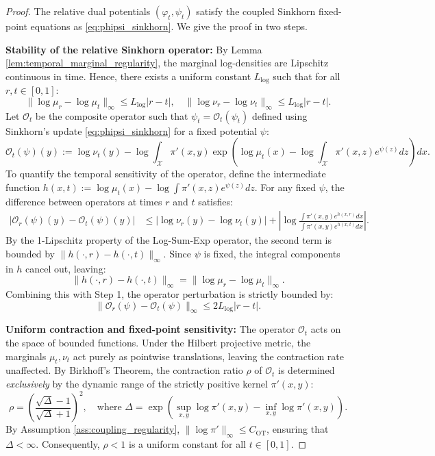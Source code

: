 \documentclass[11pt]{article}
\theoremstyle{definition}
\numberwithin{equation}{section}%
\begin{document}
{\begin{proof}
The relative dual potentials $(\varphi_t, \psi_t)$ satisfy the coupled Sinkhorn fixed-point equations as \eqref{eq:phipsi_sinkhorn}. We give the proof in two steps.

\noindent\textbf{Stability of the relative Sinkhorn operator:}  By Lemma \ref{lem:temporal_marginal_regularity}, the marginal log-densities are Lipschitz continuous in time. Hence, there exists a uniform constant $L_{\log}$ such that for all $r, t \in [0,1]$:
\begin{equation*}
\label{eq:marg_stability_ref}
\|\log \mu_r - \log \mu_t\|_\infty \le L_{\log} |r - t|, \quad \|\log \nu_r - \log \nu_t\|_\infty \le L_{\log} |r - t|.
\end{equation*}
Let $\mathcal{O}_t$ be the composite operator such that $\psi_t = \mathcal{O}_t(\psi_t)$ defined using Sinkhorn's update \eqref{eq:phipsi_sinkhorn} for a fixed potential $\psi$:
\begin{equation*}
\mathcal{O}_t(\psi)(y) := \log \nu_t(y) - \log \int_{\mathcal{X}} \pi'(x,y) \exp \left( \log \mu_t(x) - \log \int_{\mathcal{X}} \pi'(x,z) e^{\psi(z)} dz \right) dx.
\end{equation*}
To quantify the temporal sensitivity of the operator, define the intermediate function $h(x, t) := \log \mu_t(x) - \log \int \pi'(x,z) e^{\psi(z)} dz$. For any fixed $\psi$, the difference between operators at times $r$ and $t$ satisfies:
\begin{align*}
|\mathcal{O}_r(\psi)(y) - \mathcal{O}_t(\psi)(y)| &\le |\log \nu_r(y) - \log \nu_t(y)| + \left| \log \frac{ \int \pi'(x,y) e^{h(x, r)} dx }{ \int \pi'(x,y) e^{h(x, t)} dx } \right|.
\end{align*}
By the 1-Lipschitz property of the Log-Sum-Exp operator, the second term is bounded by $\|h(\cdot, r) - h(\cdot, t)\|_\infty$. Since $\psi$ is fixed, the integral components in $h$ cancel out, leaving:
\[
\|h(\cdot, r) - h(\cdot, t)\|_\infty = \|\log \mu_r - \log \mu_t\|_\infty.
\]
Combining this with Step 1, the operator perturbation is strictly bounded by:
\begin{equation}
\label{eq:operator_perturbation}
\|\mathcal{O}_r(\psi) - \mathcal{O}_t(\psi)\|_\infty \le 2 L_{\log} |r - t|.
\end{equation}

\noindent\textbf{Uniform contraction and fixed-point sensitivity:} The operator $\mathcal{O}_t$ acts on the space of bounded functions. Under the Hilbert projective metric, the marginals $\mu_t, \nu_t$ act purely as pointwise translations, leaving the contraction rate unaffected. By Birkhoff's Theorem, the contraction ratio $\rho$ of $\mathcal{O}_t$ is determined \textit{exclusively} by the dynamic range of the strictly positive kernel $\pi'(x,y)$:
\begin{equation*}
\rho = \left( \frac{\sqrt{\Delta} - 1}{\sqrt{\Delta} + 1} \right)^2, \quad \text{where } \Delta = \exp\left( \sup_{x,y} \log \pi'(x,y) - \inf_{x,y} \log \pi'(x,y) \right).
\end{equation*}
By Assumption \ref{ass:coupling_regularity}, $\|\log \pi'\|_\infty \le C_\mathrm{OT}$, ensuring that $\Delta < \infty$. Consequently, $\rho < 1$ is a uniform constant for all $t \in [0,1]$. 


\end{proof}}
\end{document}
